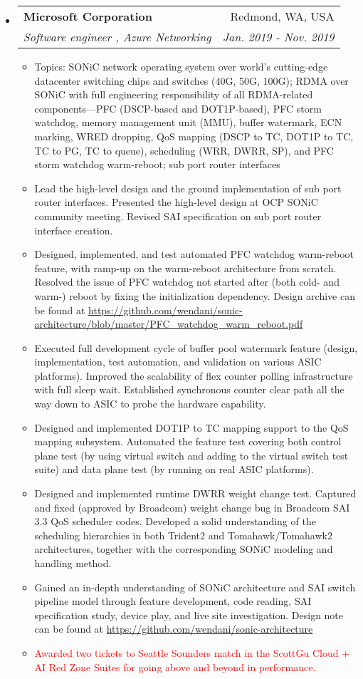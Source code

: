 \documentclass[letterpaper,11pt]{article}
\makeatletter
\newcommand{\ressubheading}[4]{
\begin{tabular*}{6.69in}{l@{\extracolsep{\fill}}r}
        \textbf{#1} & #2 \\
        \textit{#3} & \textit{#4} \\
\end{tabular*}\vspace{-6pt}
}
\newcommand{\resitem}[1]{\item #1 \vspace{-2pt}}
\makeatother
\begin{document}
\begin{itemize}
\item
  \ressubheading{Microsoft Corporation}{Redmond, WA, USA}
  {Software engineer \Romannum{2}, Azure Networking}{Jan. 2019 - Nov. 2019}
  \begin{itemize}
  \resitem{Topics: SONiC network operating system over world's cutting-edge datacenter switching chips and switches (40G, 50G, 100G);
  RDMA over SONiC with full engineering responsibility of all RDMA-related components---PFC (DSCP-based and DOT1P-based), PFC storm watchdog,
  memory management unit (MMU), buffer watermark, ECN marking,
  WRED dropping, QoS mapping (DSCP to TC, DOT1P to TC, TC to PG, TC to queue), scheduling (WRR, DWRR, SP), and PFC storm watchdog warm-reboot;
  sub port router interfaces}
  \resitem{Lead the high-level design and the ground implementation of sub port router interfaces.
  Presented the high-level design at OCP SONiC community meeting. Revised SAI specification on sub port router interface creation.}
  \resitem{Designed, implemented, and test automated PFC watchdog warm-reboot feature, with ramp-up on the
  warm-reboot architecture from scratch.
  Resolved the issue of PFC watchdog not started after (both cold- and warm-) reboot by fixing the initialization dependency.
  Design archive can be found at \url{https://github.com/wendani/sonic-architecture/blob/master/PFC\_watchdog\_warm\_reboot.pdf}}
  \resitem{Executed full development cycle of buffer pool watermark feature (design, implementation, test automation, and validation on various ASIC platforms).
  Improved the scalability of flex counter polling infrastructure with full sleep wait.
  Established synchronous counter clear path all the way down to ASIC to probe the hardware capability.}
  \resitem{Designed and implemented DOT1P to TC mapping support to the QoS mapping subsystem.
  Automated the feature test covering both control plane test (by using virtual switch and adding to the virtual switch test suite) and data plane
  test (by running on real ASIC platforms).}
  \resitem{Designed and implemented runtime DWRR weight change test.
  Captured and fixed (approved by Broadcom) weight change bug in Broadcom SAI 3.3 QoS scheduler codes.
  Developed a solid understanding of the scheduling hierarchies in both Trident2 and Tomahawk/Tomahawk2 architectures,
  together with the corresponding SONiC modeling and handling method.}
  \resitem{Gained an in-depth understanding of SONiC architecture and SAI switch pipeline model
  through feature development, code reading, SAI specification study, device play, and live site investigation.
  Design note can be found at \url{https://github.com/wendani/sonic-architecture}}
  \resitem{\textcolor{Red}{Awarded two tickets to Seattle Sounders match in the ScottGu Cloud + AI Red Zone Suites for going above and beyond in performance.}}
  \end{itemize}


\end{itemize}
\end{document}
